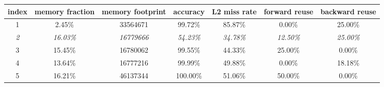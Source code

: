 \begin{tabular}{|c|c|c|c|c|c|c|}
  \hline
    index & memory fraction & memory footprint & accuracy & L2 miss rate & forward reuse & backward reuse \\
  \hline
  \hline
    1 & 2.45\% & 33564671 & 99.72\% & 85.87\% & 0.00\% & 25.00\% \\
    \textit{2} & \textit{16.03\%} & \textit{16779666} & \textit{54.23\%} & \textit{34.78\%} & \textit{12.50\%} & \textit{25.00\%} \\
    3 & 15.45\% & 16780062 & 99.55\% & 44.33\% & 25.00\% & 0.00\% \\
    4 & 13.64\% & 16777216 & 99.99\% & 49.88\% & 0.00\% & 18.18\% \\
    5 & 16.21\% & 46137344 & 100.00\% & 51.06\% & 50.00\% & 0.00\% \\
  \hline
\end{tabular}
